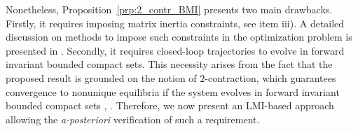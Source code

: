 \documentclass{ifacconf}
\newtheorem{proposition}{Proposition}
\begin{document}
Nonetheless, Proposition~\ref{prp:2_contr_BMI} presents two main drawbacks. Firstly, it requires imposing matrix inertia constraints, see item iii). A detailed discussion on methods to impose such constraints in the optimization problem is presented in \citep[Section 3]{zoboli2024dynamic}. Secondly, it requires closed-loop trajectories to evolve in forward invariant bounded compact sets. This necessity arises from the fact that the proposed result is grounded on the notion of $2$-contraction, which guarantees convergence to nonunique equilibria if the system evolves in forward invariant bounded compact sets \citep[Theorem 2.5]{Michael1995}, \citep[Lemma 6]{cecilia2023generalized}. Therefore, we now present an LMI-based approach allowing the \textit{a-posteriori} verification of such a requirement.
\end{document}
